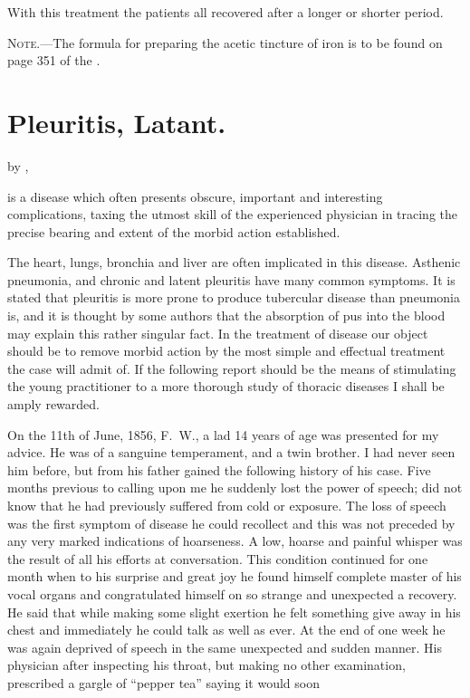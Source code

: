 
With this treatment the patients all recovered after a longer or shorter
period.

\textsc{Note.---}The formula for preparing the acetic tincture of iron is to be
found on page 351 of the .

\section*{Pleuritis, Latant.}

by ,\ \md

 is a disease which often presents obscure, important and interesting
complications, taxing the utmost skill of the experienced physician
in tracing the precise bearing and extent of the morbid action
established.

The heart, lungs, bronchia and liver are often implicated in this disease.
Asthenic pneumonia, and chronic and latent pleuritis have many common
symptoms. It is stated that pleuritis is more prone to produce
tubercular disease than pneumonia is, and it is thought by some authors
that the absorption of pus into the blood may explain this rather singular
fact. In the treatment of disease our object should be to remove
morbid action by the most simple and effectual treatment the case will
admit of. If the following report should be the means of stimulating
the young practitioner to a more thorough study of thoracic diseases I
shall be amply rewarded.

On the 11th of June, 1856, F.~W., a lad 14 years of age was presented
for my advice. He was of a sanguine temperament, and a twin brother.
I had never seen him before, but from his father gained the following
history of his case. Five months previous to calling upon me he suddenly
lost the power of speech; did not know that he had previously
suffered from cold or exposure. The loss of speech was the first symptom
of disease he could recollect and this was not preceded by any
very marked indications of hoarseness. A low, hoarse and painful
whisper was the result of all his efforts at conversation. This condition
continued for one month when to his surprise and great joy he found
himself complete master of his vocal organs and congratulated himself
on so strange and unexpected a recovery. He said that while making
some slight exertion he felt something give away in his chest and immediately
he could talk as well as ever. At the end of one week he
was again deprived of speech in the same unexpected and sudden manner.
His physician after inspecting his throat, but making no other
examination, prescribed a gargle of ``pepper tea'' saying it would soon\endinput
